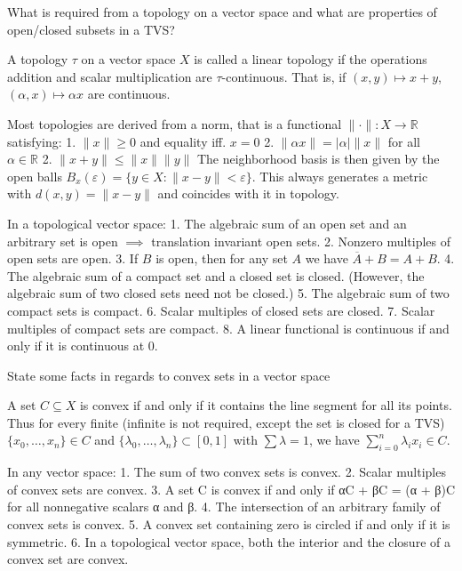 What is required from a topology on a vector space and what are properties of open/closed subsets in a TVS?

A topology \( \tau \) on a vector space \( X \) is called a linear topology if the operations
addition and scalar multiplication are \( \tau \)-continuous. 
That is, if \( (x, y) \mapsto x + y \), \( (\alpha, x) \mapsto \alpha x \) are continuous.

Most topologies are derived from a norm, that is a functional \( \| \cdot \| : X \to \mathbb{R} \)
satisfying:
1. \( \|x\| \geq 0 \) and equality iff. \( x = 0 \)
2. \( \|\alpha x \| = |\alpha| \|x\| \) for all \( \alpha \in \mathbb{R} \)
2. \( \|x + y \| \leq \|x\| \|y\| \)
The neighborhood basis is then given by the open balls \( B_x(\varepsilon) = \{y \in X : \|x - y\| < \varepsilon \} \).
This always generates a metric with \( d(x, y) = \|x - y\| \) and coincides with it in topology.

In a topological vector space:
1. The algebraic sum of an open set and an arbitrary set is open \(\implies\) translation invariant open sets.
2. Nonzero multiples of open sets are open.
3. If \( B \) is open, then for any set \( A \) we have \( \overline{A} + B = A + B \).
4. The algebraic sum of a compact set and a closed set is closed. (However,
the algebraic sum of two closed sets need not be closed.)
5. The algebraic sum of two compact sets is compact.
6. Scalar multiples of closed sets are closed.
7. Scalar multiples of compact sets are compact.
8. A linear functional is continuous if and only if it is continuous at 0.



State some facts in regards to convex sets in a vector space

A set \( C \subseteq X \) is convex if and only if it contains the line segment for all its points.
Thus for every finite (infinite is not required, except the set is closed for a TVS)
\( \{x_0, \dots, x_n\} \in C \) and \( \{\lambda_0, \dots, \lambda_n\} \subset [0, 1]   \)
with \( \sum \lambda = 1 \), we have \( \sum^{n}_{i=0} \lambda_{i} x_{i} \in C \).

In any vector space:
1. The sum of two convex sets is convex.
2. Scalar multiples of convex sets are convex.
3. A set C is convex if and only if αC + βC = (α + β)C for all nonnegative
scalars α and β.
4. The intersection of an arbitrary family of convex sets is convex.
5. A convex set containing zero is circled if and only if it is symmetric.
6. In a topological vector space, both the interior and the closure of a convex
set are convex.


